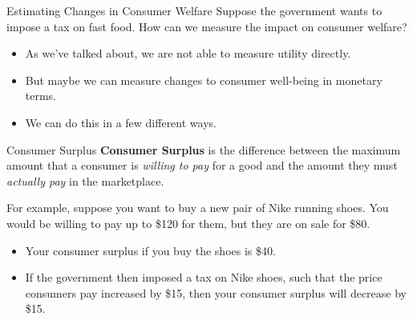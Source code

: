 \documentclass[12pt,t]{beamer}
\begin{document}
\begin{frame}{Estimating Changes in Consumer Welfare}
  Suppose the government wants to impose a tax on fast food. How can we measure the impact on consumer welfare?

  \begin{itemize}
    \item As we've talked about, we are not able to measure utility directly.

    \item But maybe we can measure changes to consumer well-being in monetary terms.

    \item We can do this in a few different ways.
  \end{itemize}
\end{frame}

\begin{frame}{Consumer Surplus}
  \textbf{Consumer Surplus} is the difference between the maximum amount that a consumer is \emph{willing to pay} for a good and the amount they must \emph{actually pay} in the marketplace.
  

  \bigskip\pause
  For example, suppose you want to buy a new pair of Nike running shoes. You would be willing to pay up to \$120 for them, but they are on sale for \$80. 

  \begin{itemize}
    \item Your consumer surplus if you buy the shoes is \$40.
    
    \item If the government then imposed a tax on Nike shoes, such that the price consumers pay increased by \$15, then your consumer surplus will decrease by \$15.
  \end{itemize}
\end{frame}
\end{document}
